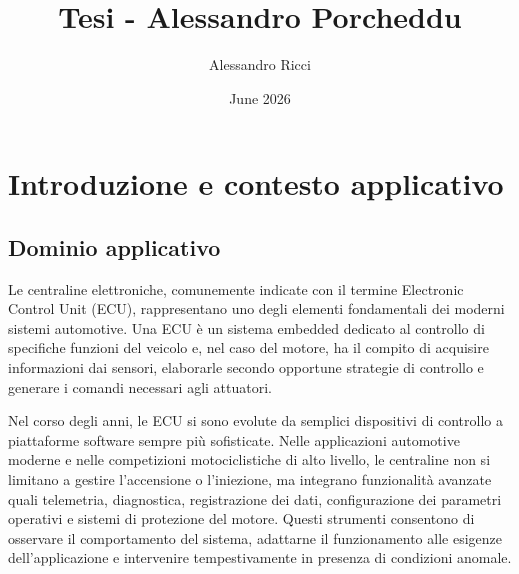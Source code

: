 \documentclass{article}
\title{Tesi - Alessandro Porcheddu}
\author{Alessandro Ricci}
\date{June 2026}
\begin{document}
\maketitle



\section{Introduzione e contesto applicativo}
\label{sec:introduzione}

\subsection{Dominio applicativo}

Le centraline elettroniche, comunemente indicate con il termine Electronic Control Unit (ECU), rappresentano uno degli elementi fondamentali dei moderni sistemi automotive. Una ECU è un sistema embedded dedicato al controllo di specifiche funzioni del veicolo e, nel caso del motore, ha il compito di acquisire informazioni dai sensori, elaborarle secondo opportune strategie di controllo e generare i comandi necessari agli attuatori.

Nel corso degli anni, le ECU si sono evolute da semplici dispositivi di controllo a piattaforme software sempre più sofisticate. Nelle applicazioni automotive moderne e nelle competizioni motociclistiche di alto livello, le centraline non si limitano a gestire l'accensione o l'iniezione, ma integrano funzionalità avanzate quali telemetria, diagnostica, registrazione dei dati, configurazione dei parametri operativi e sistemi di protezione del motore. Questi strumenti consentono di osservare il comportamento del sistema, adattarne il funzionamento alle esigenze dell'applicazione e intervenire tempestivamente in presenza di condizioni anomale.
\end{document}

